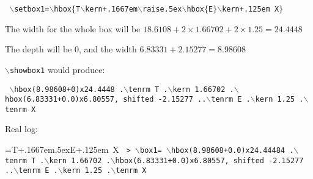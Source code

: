 {\tt
$\backslash$setbox1=$\backslash$hbox$\{$T$\backslash$kern+.1667em$\backslash$raise.5ex$\backslash$hbox$\{$E$\}$$\backslash$kern+.125em X$\}$}

The width for the whole box will be $18.6108 + 2 \times 1.66702 + 2 \times 1.25 = 24.4448$

The depth will be 0, and the width $6.83331+2.15277 = 8.98608$

{\tt $\backslash$showbox1} would produce:

{\tt \obeylines
$\backslash$hbox(8.98608+0)x24.4448
.$\backslash$tenrm T
.$\backslash$kern 1.66702
.$\backslash$hbox(6.83331+0.0)x6.80557, shifted -2.15277
..$\backslash$tenrm E
.$\backslash$kern 1.25
.$\backslash$tenrm X
}


Real log:

=\hbox{T\kern+.1667em\raise.5ex\hbox{E}\kern+.125em X}
{\tt \obeylines
> $\backslash$box1=
$\backslash$hbox(8.98608+0.0)x24.44484
.$\backslash$tenrm T
.$\backslash$kern 1.66702
.$\backslash$hbox(6.83331+0.0)x6.80557, shifted -2.15277
..$\backslash$tenrm E
.$\backslash$kern 1.25
.$\backslash$tenrm X
}

\bye
